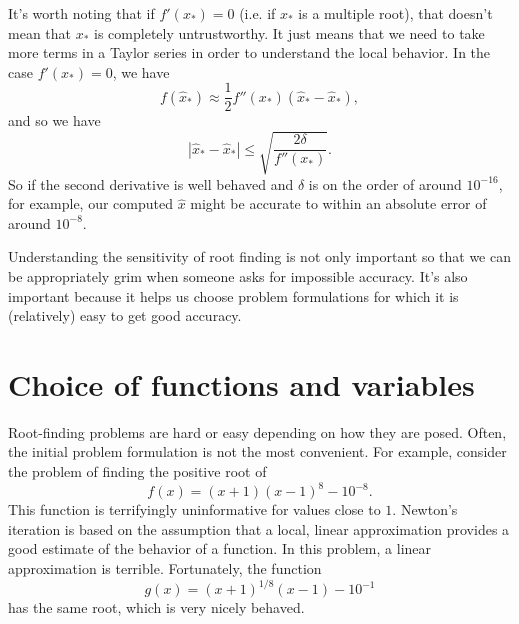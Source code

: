 \documentclass[12pt, leqno]{article} %
\begin{document}
It's worth noting that if $f'(x_*) = 0$ (i.e. if $x_*$ is a multiple
root), that doesn't mean that $x_*$ is completely untrustworthy.  It
just means that we need to take more terms in a Taylor series in order
to understand the local behavior.  In the case $f'(x_*) = 0$, we have
\[
  f(\hat{x}_*) \approx \frac{1}{2} f''(x_*) (\hat{x}_*-\hat{x}_*),
\]
and so we have
\[
  |\hat{x}_*-\hat{x}_*| \leq \sqrt{\frac{2\delta}{f''(x_*)}}.
\]
So if the second derivative is well behaved and $\delta$ is on the
order of around $10^{-16}$, for example, our computed $\hat{x}$ might
be accurate to within an absolute error of around $10^{-8}$.

Understanding the sensitivity of root finding is not only important so
that we can be appropriately grim when someone asks for impossible
accuracy.  It's also important because it helps us choose problem
formulations for which it is (relatively) easy to get good accuracy.

\section*{Choice of functions and variables}




Root-finding problems are hard or easy depending on how they are
posed.  Often, the initial problem formulation is not the most
convenient.  For example, consider the problem of finding the
positive root of
\[
  f(x) = (x+1)(x-1)^8-10^{-8}.
\]
This function is terrifyingly uninformative for values close to $1$.
Newton's iteration is based on the assumption that a local, linear
approximation provides a good estimate of the behavior of a function.
In this problem, a linear approximation is terrible.  Fortunately,
the function
\[
  g(x) = (x+1)^{1/8} (x-1)-10^{-1}
\]
has the same root, which is very nicely behaved.
\end{document}
